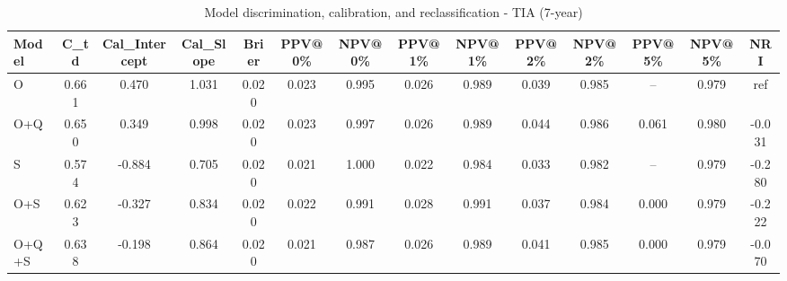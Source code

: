 \begin{table}[htbp]
\centering
\small
\caption{Model discrimination, calibration, and reclassification - TIA (7-year)}
\label{tab:perf_tia_7y}
\begin{tabular}{lccccccccccccc}
\toprule
Model & C\_td & Cal\_Intercept & Cal\_Slope & Brier & PPV@0\% & NPV@0\% & PPV@1\% & NPV@1\% & PPV@2\% & NPV@2\% & PPV@5\% & NPV@5\% & NRI \\
\midrule
O & 0.661 & 0.470 & 1.031 & 0.020 & 0.023 & 0.995 & 0.026 & 0.989 & 0.039 & 0.985 & -- & 0.979 & ref \\
O+Q & 0.650 & 0.349 & 0.998 & 0.020 & 0.023 & 0.997 & 0.026 & 0.989 & 0.044 & 0.986 & 0.061 & 0.980 & -0.031 \\
S & 0.574 & -0.884 & 0.705 & 0.020 & 0.021 & 1.000 & 0.022 & 0.984 & 0.033 & 0.982 & -- & 0.979 & -0.280 \\
O+S & 0.623 & -0.327 & 0.834 & 0.020 & 0.022 & 0.991 & 0.028 & 0.991 & 0.037 & 0.984 & 0.000 & 0.979 & -0.222 \\
O+Q+S & 0.638 & -0.198 & 0.864 & 0.020 & 0.021 & 0.987 & 0.026 & 0.989 & 0.041 & 0.985 & 0.000 & 0.979 & -0.070 \\
\bottomrule
\end{tabular}
\end{table}